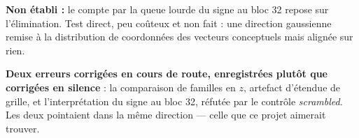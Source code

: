 \documentclass[a4paper,10pt]{article}
\begin{document}
\textbf{Non établi :} le compte par la queue lourde du signe au bloc 32 repose sur l'élimination.
Test direct, peu coûteux et non fait : une direction gaussienne remise à la distribution de
coordonnées des vecteurs conceptuels mais alignée sur rien.

\textbf{Deux erreurs corrigées en cours de route, enregistrées plutôt que corrigées en silence} : la
comparaison de familles en $z$, artefact d'étendue de grille, et l'interprétation du signe au bloc
32, réfutée par le contrôle \emph{scrambled}. Les deux pointaient dans la même direction --- celle
que ce projet aimerait trouver.
\end{document}
